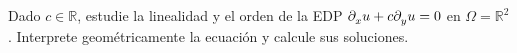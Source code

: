 \begin{multicols}{3}
\end{multicols}

\question

Dado $c\in\mathbb{R}$, estudie la linealidad y el orden de la EDP
\begin{math}
	\difcp{u}{x}+
	c\difcp{u}{y}=
	0
\end{math}
en $\Omega=\mathbb{R}^{2}$.
Interprete geométricamente la ecuación y calcule sus soluciones.

\question

